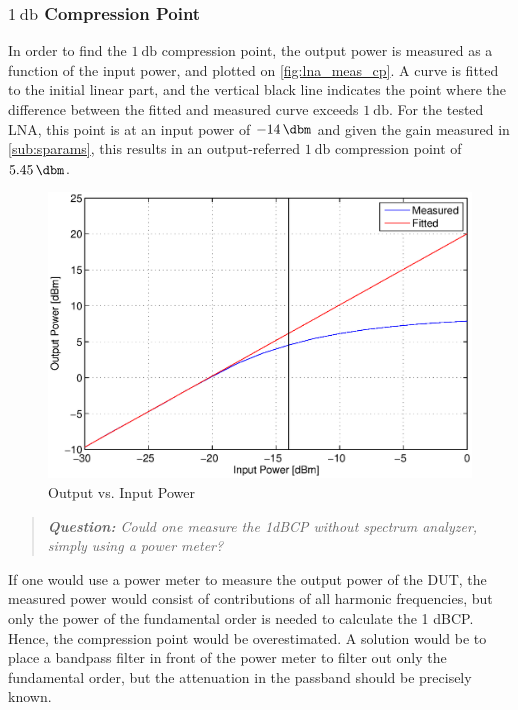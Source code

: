 \documentclass[a4paper]{article}        %
\begin{document}
  \subsubsection{$\SI{1}{\decibel}$ Compression Point}
  In order to find the $\SI{1}{\decibel}$ compression point, the output power is measured as a function of the input power, and plotted on \autoref{fig:lna_meas_cp}.
  A curve is fitted to the initial linear part, and the vertical black line indicates the point where the difference between the fitted and measured curve exceeds $\SI{1}{\decibel}$.
  For the tested LNA, this point is at an input power of $\SI{-14}{\dbm}$ and given the gain measured in \autoref{sub:sparams}, this results in an output-referred $\SI{1}{\decibel}$ compression point of $\SI{5.45}{\dbm}$.

  \begin{figure}[H]
    \centering
    \includegraphics[width=\textwidth]{fig/LNA/compression_lna.eps}
    \caption{Output vs. Input Power}
    \label{fig:lna_meas_cp}
  \end{figure}

  \begin{quote} \textit{\textbf{Question:} Could one measure the 1dBCP without spectrum analyzer, simply using a power meter? }\end{quote}

  If one would use a power meter to measure the output power of the DUT, the measured power would consist of contributions of all harmonic frequencies, but only the power of the fundamental order is needed to calculate the 1 dBCP. Hence, the compression point would be overestimated. A solution would be to place a bandpass filter in front of the power meter to filter out only the fundamental order, but the attenuation in the passband should be precisely known. 
\end{document}
